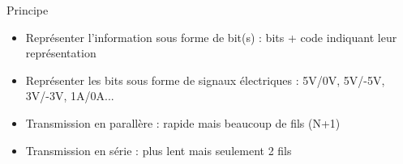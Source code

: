 \documentclass[a4paper]{article}
\begin{document}
    Principe
    \begin{itemize}
        \item Représenter l'information sous forme de bit(s) : bits + code indiquant leur représentation
        \item Représenter les bits sous forme de signaux électriques : 5V/0V, 5V/-5V, 3V/-3V, 1A/0A...
        \item Transmission en parallère : rapide mais beaucoup de fils (N+1)
        \item Transmission en série : plus lent mais seulement 2 fils
    \end{itemize}
\end{document}
